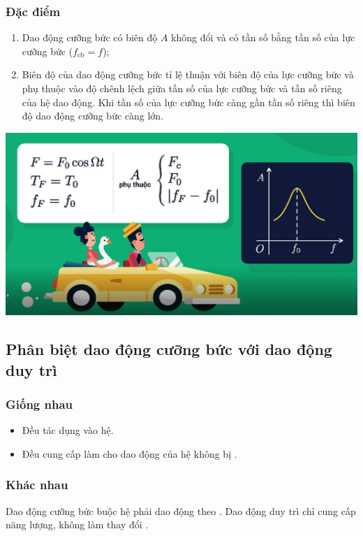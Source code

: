 \subsubsection{Đặc điểm}
\begin{enumerate}[label=\alph*)]
	\item Dao động cưỡng bức có biên độ $A$ không đổi và có tần số bằng tần số của lực cưỡng bức ($f_{\text {cb}}=f$);
	\item Biên độ của dao động cưỡng bức tỉ lệ thuận với biên độ của lực cưỡng bức và phụ thuộc vào độ chênh lệch giữa tần số của lực cưỡng bức và tần số riêng của hệ dao động. Khi tần số của lực cưỡng bức càng gần tần số riêng thì biên độ dao động cưỡng bức càng lớn.
\end{enumerate}
\begin{center}
	\includegraphics[scale=0.5]{../figs/VN12-PH-05-L-004-1-V2-02}
\end{center}
\subsection{Phân biệt dao động cưỡng bức với dao động duy trì}
\subsubsection{Giống nhau} 
\begin{itemize}
	\item Đều tác dụng  vào hệ.
	\item Đều cung cấp  làm cho dao động của hệ không bị .
\end{itemize}
\subsubsection{Khác nhau}
Dao động cưỡng bức buộc hệ phải dao động theo . Dao động duy trì chỉ cung cấp năng lượng, không làm thay đổi . 
